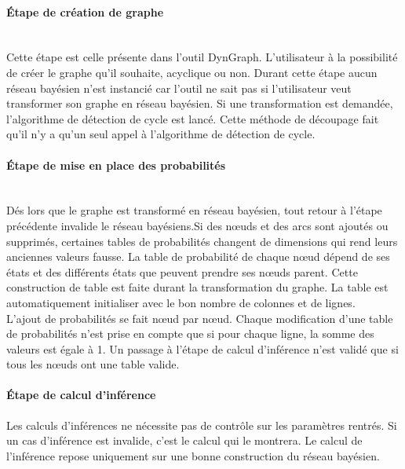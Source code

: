 \documentclass[conference]{IEEEtran}
\begin{document}
\paragraph{Étape de création de graphe \\} \\
Cette étape est celle présente dans l'outil DynGraph. L'utilisateur à la possibilité de créer le graphe qu'il souhaite, acyclique ou non. Durant cette étape aucun réseau bayésien n'est instancié car  l'outil ne sait pas si l'utilisateur veut transformer son graphe en réseau bayésien. Si une transformation est demandée, l'algorithme de détection de cycle est lancé. Cette méthode de découpage fait qu'il n'y a qu'un seul appel à l'algorithme de détection de cycle. \\

\paragraph{Étape de mise en place des probabilités \\}
\\
Dés lors que le graphe est transformé en réseau bayésien, tout retour à l'étape précédente invalide le réseau bayésiens.Si des nœuds et des arcs sont ajoutés ou supprimés, certaines tables de probabilités changent de dimensions qui rend leurs anciennes valeurs fausse. La table de probabilité de chaque nœud dépend de ses états et des différents états que peuvent prendre ses nœuds parent. Cette construction de table est faite durant la transformation du graphe. La table est automatiquement initialiser avec le bon nombre de colonnes et de lignes. \\
L'ajout de probabilités se fait nœud par nœud. Chaque modification d'une table de probabilités n'est prise en compte que si pour chaque ligne, la somme des valeurs est égale à 1. 
Un passage à l'étape de calcul d'inférence n'est validé que si tous les nœuds ont une table valide. \\

\paragraph{Étape de calcul d'inférence \\}
Les calculs d'inférences ne nécessite pas de contrôle sur les paramètres rentrés. Si un cas d'inférence est invalide, c'est le calcul qui le montrera. Le calcul de l'inférence repose uniquement sur une bonne construction du réseau bayésien. 
\end{document}
